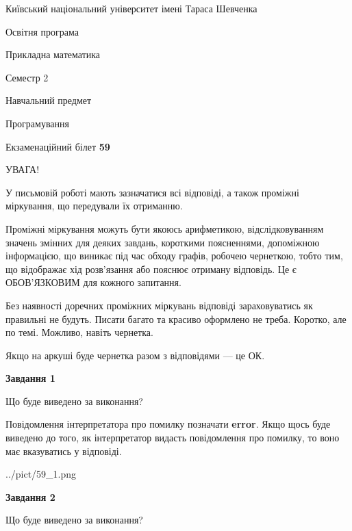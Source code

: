 \documentclass[12pt, ukrainian]{article}
\begin{document}
{{\begin {small}\par
{ \center  Київський національний університет імені Тараса Шевченка \par}
{\parbox {5 cm}{Освітня програма \hfill}{\parbox {7 cm}{Прикладна математика \hfill}}\parbox {6 cm}{\hfill Семестр 2}}\par
{\parbox {5 cm} {Навчальний предмет \hfill}\parbox {7 cm}{Програмування \hfill}\parbox {6cm}{\hfill}\par}\vspace{-7pt} \end{small}}{\center Екзаменаційний білет \No \textbf
{ 59 }\par}}
{
\begin {large}
УВАГА!

У письмовій роботі мають зазначатися всі відповіді, а також проміжні міркування, що передували їх отриманню.

Проміжні міркування можуть бути якоюсь арифметикою, відслідковуванням зна\-чень змінних для деяких завдань,
короткими поясненнями, допоміжною інформацією, що виникає під час обходу графів, робочею чернеткою,
тобто тим, що відображає хід розв’язання або пояснює отриману відповідь.
Це є ОБОВ’ЯЗКОВИМ для кожного запитання.

Без наявності доречних проміжних міркувань відповіді зараховуватись як правиль\-ні не будуть.
Писати багато та красиво оформлено не треба. Коротко, але по темі. Можли\-во, навіть чернетка.

Якщо на аркуші буде чернетка разом з відповідями --- це ОК.

\newpage

{\begin {center}\textbf{Завдання 1}\end {center}}\par
Що буде виведено за виконання?

Повідомлення інтерпретатора про помилку позначати \textbf{error}.
Якщо щось буде виведено до того, як інтерпретатор видасть повідомлення про помилку, 
то воно має вказуватись у відповіді. \par


\begin{center}
	{../pict/59_1.png}
\end{center}
\newpage

{\begin {center}\textbf{Завдання 2}\end {center}}\par
Що буде виведено за виконання?


\end{large}}
\end{document}
